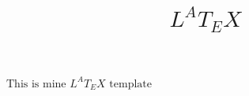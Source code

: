 \documentclass{article}
\begin{document}
	\title{\(L^AT_EX\)}
	\date{}
	\maketitle
	\(\text{This is mine } L^AT_EX \text{ template}\) 
\end{document}
